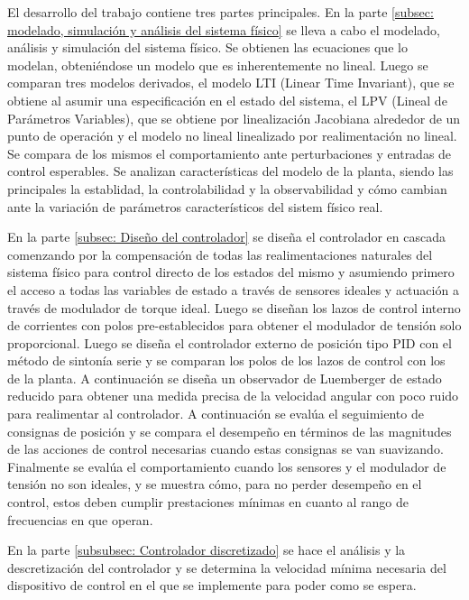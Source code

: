 \documentclass[a4paper, 10pt, onecolumn,journal]{ieeeconf}
\begin{document}
El desarrollo del trabajo contiene tres partes principales.
En la parte \ref{subsec: modelado, simulación y análisis del sistema físico} se lleva a cabo el modelado, análisis y simulación del sistema físico.
Se obtienen las ecuaciones que lo modelan, obteniéndose un modelo que es inherentemente no lineal. Luego se comparan tres modelos derivados, el modelo LTI (Linear Time Invariant), que
se obtiene al asumir una especificación en el estado del sistema, el LPV (Lineal de Parámetros Variables), que se obtiene por linealización Jacobiana alrededor de un punto de operación y 
el modelo no lineal linealizado por realimentación no lineal. Se compara de los mismos el comportamiento ante perturbaciones y entradas de control esperables. Se analizan características del modelo de la planta, siendo las principales
la establidad, la controlabilidad y la observabilidad y cómo cambian ante la variación de parámetros característicos del sistem físico real.

En la parte \ref{subsec: Diseño del controlador} se diseña el controlador en cascada comenzando por la compensación de todas las realimentaciones 
naturales del sistema físico para control directo de los estados del mismo y asumiendo primero el acceso a todas las variables de estado a través de sensores ideales y actuación a través de modulador de torque ideal. Luego se diseñan
los lazos de control interno de corrientes con polos pre-establecidos para obtener el modulador de tensión solo proporcional. Luego se diseña el controlador externo de posición tipo PID
con el método de sintonía serie y se comparan los polos de los lazos de control con los de la planta. A continuación se diseña un observador de Luemberger de estado reducido para obtener una medida precisa de la velocidad angular con poco ruido para realimentar al controlador.
A continuación se evalúa el seguimiento de consignas de posición y se compara el desempeño en términos de las magnitudes de las acciones de control necesarias cuando estas consignas se van suavizando. Finalmente se 
evalúa el comportamiento cuando los sensores y el modulador de tensión no son ideales, y se muestra cómo, para no perder desempeño en el control, estos deben cumplir prestaciones mínimas en cuanto al rango de frecuencias en que operan.

En la parte \ref{subsubsec: Controlador discretizado} se hace el análisis y la descretización del controlador y se determina la velocidad mínima necesaria del dispositivo de control en el que se implemente para poder como se espera.
\end{document}
